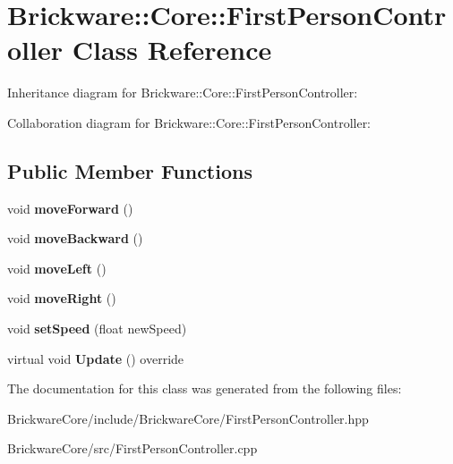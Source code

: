 \hypertarget{classBrickware_1_1Core_1_1FirstPersonController}{}\section{Brickware\+:\+:Core\+:\+:First\+Person\+Controller Class Reference}
\label{classBrickware_1_1Core_1_1FirstPersonController}


Inheritance diagram for Brickware\+:\+:Core\+:\+:First\+Person\+Controller\+:


Collaboration diagram for Brickware\+:\+:Core\+:\+:First\+Person\+Controller\+:
\subsection*{Public Member Functions}
\begin{DoxyCompactItemize}
\item 
\hypertarget{classBrickware_1_1Core_1_1FirstPersonController_a06164dfb22febeded19dfb726d687ab3}{}void {\bfseries move\+Forward} ()\label{classBrickware_1_1Core_1_1FirstPersonController_a06164dfb22febeded19dfb726d687ab3}

\item 
\hypertarget{classBrickware_1_1Core_1_1FirstPersonController_a67252cb1683e2078e806ce60a306cbf4}{}void {\bfseries move\+Backward} ()\label{classBrickware_1_1Core_1_1FirstPersonController_a67252cb1683e2078e806ce60a306cbf4}

\item 
\hypertarget{classBrickware_1_1Core_1_1FirstPersonController_a9f4ae3e125ef1767a1265d99f9b71ff1}{}void {\bfseries move\+Left} ()\label{classBrickware_1_1Core_1_1FirstPersonController_a9f4ae3e125ef1767a1265d99f9b71ff1}

\item 
\hypertarget{classBrickware_1_1Core_1_1FirstPersonController_ab1ef3c9f7c412af5b2d8615f8a4ca23d}{}void {\bfseries move\+Right} ()\label{classBrickware_1_1Core_1_1FirstPersonController_ab1ef3c9f7c412af5b2d8615f8a4ca23d}

\item 
\hypertarget{classBrickware_1_1Core_1_1FirstPersonController_aaa749b7488addc501ac57bdad72905ca}{}void {\bfseries set\+Speed} (float new\+Speed)\label{classBrickware_1_1Core_1_1FirstPersonController_aaa749b7488addc501ac57bdad72905ca}

\item 
\hypertarget{classBrickware_1_1Core_1_1FirstPersonController_a770b4fec7309fccf67bf7eedf2c662a8}{}virtual void {\bfseries Update} () override\label{classBrickware_1_1Core_1_1FirstPersonController_a770b4fec7309fccf67bf7eedf2c662a8}

\end{DoxyCompactItemize}


The documentation for this class was generated from the following files\+:\begin{DoxyCompactItemize}
\item 
Brickware\+Core/include/\+Brickware\+Core/First\+Person\+Controller.\+hpp\item 
Brickware\+Core/src/First\+Person\+Controller.\+cpp\end{DoxyCompactItemize}
